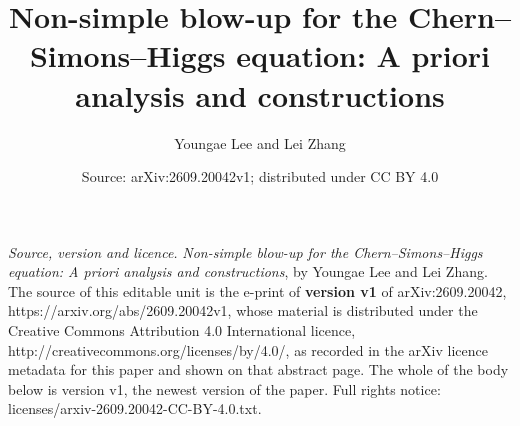 \documentclass[10pt,a4paper]{amsart}
\numberwithin{equation}{section}
\theoremstyle{definition}
\theoremstyle{remark}
\begin{document}
\title{Non-simple blow-up for the Chern--Simons--Higgs equation: A priori analysis and constructions}
\author{Youngae Lee and Lei Zhang}
\date{Source: arXiv:2609.20042v1; distributed under CC BY 4.0}
\maketitle
\noindent\emph{Source, version and licence.} \emph{Non-simple blow-up for the Chern--Simons--Higgs equation: A priori analysis and constructions}, by Youngae Lee and Lei Zhang. The source of this editable unit is the e-print of \textbf{version v1} of arXiv:2609.20042, https://arxiv.org/abs/2609.20042v1, whose material is distributed under the Creative Commons Attribution 4.0 International licence, http://creativecommons.org/licenses/by/4.0/, as recorded in the arXiv licence metadata for this paper and shown on that abstract page. The whole of the body below is version v1, the newest version of the paper. Full rights notice: licenses/arxiv-2609.20042-CC-BY-4.0.txt.\par\smallskip
\end{document}
